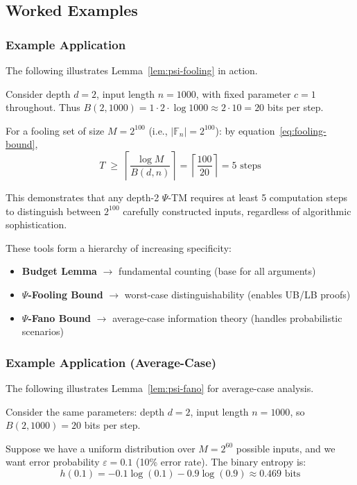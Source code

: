 \subsection{Worked Examples}
\subsubsection{Example Application}
The following illustrates Lemma~\ref{lem:psi-fooling} in action.

Consider depth $d = 2$, input length $n = 1000$, with fixed parameter $c = 1$ throughout.
Thus $B(2,1000) = 1 \cdot 2 \cdot \log 1000 \approx 2 \cdot 10 = 20$ bits per step.

For a fooling set of size $M = 2^{100}$ (i.e., $|\mathbb{F}_n| = 2^{100}$): by equation~\eqref{eq:fooling-bound},
\[T \;\geq\; \left\lceil \frac{\log M}{B(d,n)} \right\rceil = \left\lceil \frac{100}{20} \right\rceil = 5 \text{ steps}\]

This demonstrates that any depth-2 $\Psi$-TM requires at least 5 computation steps to distinguish between $2^{100}$ carefully constructed inputs, regardless of algorithmic sophistication.

\begin{remark}
These tools form a hierarchy of increasing specificity:
\begin{itemize}
\item \textbf{Budget Lemma} $\to$ fundamental counting (base for all arguments)
\item \textbf{$\Psi$-Fooling Bound} $\to$ worst-case distinguishability (enables UB/LB proofs)
\item \textbf{$\Psi$-Fano Bound} $\to$ average-case information theory (handles probabilistic scenarios)
\end{itemize}
\end{remark}

\subsubsection{Example Application (Average-Case)}
The following illustrates Lemma~\ref{lem:psi-fano} for average-case analysis.

Consider the same parameters: depth $d = 2$, input length $n = 1000$, so $B(2,1000) = 20$ bits per step.

Suppose we have a uniform distribution over $M = 2^{60}$ possible inputs, and we want error probability $\varepsilon = 0.1$ (10\% error rate). The binary entropy is:
\[h(0.1) = -0.1 \log(0.1) - 0.9 \log(0.9) \approx 0.469 \text{ bits}\]

